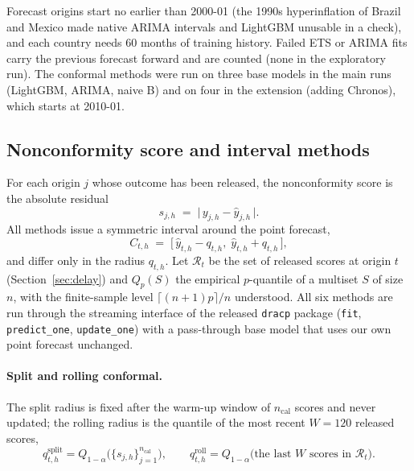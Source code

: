 Forecast origins start no earlier than 2000-01 (the 1990s hyperinflation of Brazil and Mexico made native ARIMA intervals and LightGBM unusable in a check), and each country needs 60 months of training history. Failed ETS or ARIMA fits carry the previous forecast forward and are counted (none in the exploratory run). The conformal methods were run on three base models in the main runs (LightGBM, ARIMA, naive B) and on four in the extension (adding Chronos), which starts at 2010-01.

\subsection{Nonconformity score and interval methods}\label{sec:intervals}

For each origin $j$ whose outcome has been released, the nonconformity score is the absolute residual
\begin{equation}\label{eq:score}
s_{j,h} \;=\; \bigl|\,y_{j,h}-\hat y_{j,h}\,\bigr|.
\end{equation}
All methods issue a symmetric interval around the point forecast,
\begin{equation}\label{eq:interval}
C_{t,h} \;=\; \bigl[\,\hat y_{t,h}-q_{t,h},\;\hat y_{t,h}+q_{t,h}\,\bigr],
\end{equation}
and differ only in the radius $q_{t,h}$. Let $\mathcal R_{t}$ be the set of released scores at origin $t$ (Section~\ref{sec:delay}) and $Q_{p}(S)$ the empirical $p$-quantile of a multiset $S$ of size $n$, with the finite-sample level $\lceil (n+1)p\rceil/n$ understood. All six methods are run through the streaming interface of the released \texttt{dracp} package (\texttt{fit}, \texttt{predict\_one}, \texttt{update\_one}) with a pass-through base model that uses our own point forecast unchanged.

\paragraph{Split and rolling conformal.} The split radius is fixed after the warm-up window of $n_{\mathrm{cal}}$ scores and never updated; the rolling radius is the quantile of the most recent $W=120$ released scores,
\begin{equation}\label{eq:split}
q^{\mathrm{split}}_{t,h} = Q_{1-\alpha}\bigl(\{s_{j,h}\}_{j=1}^{n_{\mathrm{cal}}}\bigr),\qquad
q^{\mathrm{roll}}_{t,h} = Q_{1-\alpha}\bigl(\text{the last } W \text{ scores in } \mathcal R_t\bigr).
\end{equation}

